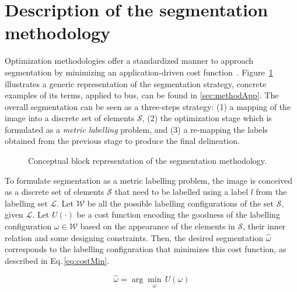 \graphicspath{ {./content/method/figures/visual_cues/}{./content/method/figures/}}

\section{Description of the segmentation methodology}\label{sec:method}

Optimization methodologies offer a standardized manner to approach segmentation by minimizing an application-driven cost function~\cite{cremers2007review}.
Figure~\ref{fig:method} illustrates a generic representation of the segmentation strategy,
concrete examples of its terms, applied to \ac{bus}, can be found in \cref{sec:methodApp}.
The overall segmentation can be seen as a three-steps strategy:
(1) a mapping of the image into a discrete set of elements $\mathcal{S}$,
(2) the optimization stage which is formulated as a \emph{metric labelling} problem,
and (3) a re-mapping the labels obtained from the previous stage to produce the final delineation.


\begin{figure}[htpb]
  \footnotesize
  \centering
  
  \caption{Conceptual block representation of the segmentation methodology.}%
  \label{fig:method}
\end{figure}


To formulate segmentation as a metric labelling problem, the image is conceived as a discrete set of elements $\mathcal{S}$ that need to be labelled using a label $l$ from the labelling set $\mathcal{L}$.
Let $\mathcal{W}$ be all the possible labelling configurations of the set $\mathcal{S}$, given $\mathcal{L}$.
Let $U(\cdot)$ be a cost function encoding the goodness of the labelling configuration $\omega \in \mathcal{W}$ based on the appearance of the elements in $\mathcal{S}$, their inner relation and some designing constraints.
Then, the desired segmentation $\hat{\omega}$ corresponds to the labelling configuration that minimizes this cost function, as described in Eq.\,\eqref{eq:costMin}.

\begin{equation}
\hat{\omega} = \arg \min_{\substack{\omega}} \,U(\omega)
\label{eq:costMin}
\end{equation}

